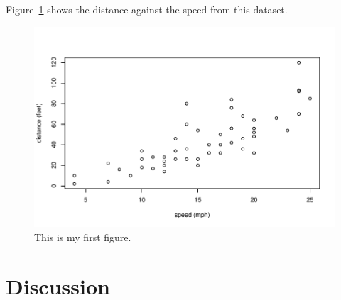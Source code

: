 \documentclass[12pt]{article}
\begin{document}
Figure~\ref{fig:cars} shows the distance against the speed from this dataset.


\begin{figure}[tbp]
  \centering
  \includegraphics[width=\textwidth]{cars.pdf}
  \caption{This is my first figure.}
  \label{fig:cars}
\end{figure}

\section{Discussion}
\label{sec:disc}
\end{document}
